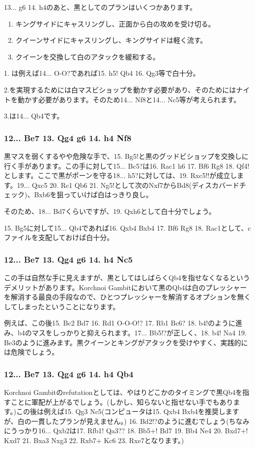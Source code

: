 13... g6 14. h4のあと、黒としてのプランはいくつかあります。
\begin{enumerate}
\item キングサイドにキャスリングし、正面から白の攻めを受け切る。
\item クイーンサイドにキャスリングし、キングサイドは軽く流す。
\item クイーンを交換して白のアタックを緩和する。
\end{enumerate}
1. は例えば14... O-O?であれば15. h5! Qb4 16. Qg3等で白十分。

2.を実現するためには白マスビショップを動かす必要があり、そのためにはナイトを動かす必要があります。そのため14... Nf8と14... Nc5等が考えられます。

3.は14... Qb4です。

\subsubsection{12... Be7 13. Qg4 g6 14. h4 Nf8}
黒マスを弱くするやや危険な手で、15. Bg5!と黒のグッドビショップを交換しに行く手があります。この手に対して15... Bc5?は16. Rac1 h6 17. Bf6 Rg8 18. Qf4!とします。ここで黒がポーンを守る18... h5?に対しては、19. Rxc5!!が成立します。19... Qxc5 20. Rc1 Qb6 21. Ng5!として次のNxf7からBd8(ディスカバードチェック)、Bxb6を狙っていけば白はっきり良し。

そのため、18... Bd7くらいですが、19. Qxh6として白十分でしょう。

15. Bg5に対して15... Qb4であれば16. Qxb4 Bxb4 17. Bf6 Rg8 18. Rac1として、cファイルを支配しておけば白十分。

\subsubsection{12... Be7 13. Qg4 g6 14. h4 Nc5}
この手は自然な手に見えますが、黒としてはしばらくQb4を指せなくなるというデメリットがあります。Korchnoi Gambitにおいて黒のQb4は白のプレッシャーを解消する最良の手段なので、ひとつプレッシャーを解消するオプションを無くしてしまったということになります。

例えば、この後15. Bc2 Bd7 16. Rd1 O-O-O!? 17. Rb1 Bc6? 18. b4!のように進み、b4のマスをしっかりと抑えられます。17... Bb5!?が正しく、18. b4! Na4 19. Be3のように進みます。黒クイーンとキングがアタックを受けやすく、実践的には危険でしょう。

\subsubsection{12... Be7 13. Qg4 g6 14. h4 Qb4}
Korchnoi Gambitのrefutationとしては、やはりどこかのタイミングで黒Qb4を指すことに軍配が上がるでしょう。(しかし、知らないと指せない手でもあります。)この後は例えば15. Qg3 Nc5(コンピュータは15. Qxb4 Bxb4を推奨しますが、白の一貫したプランが見えません。) 16. Bd2!?のように進むでしょう(ちなみにうっかり16... Qxb2は17. Rfb1! Qa3?? 18. Bb5+! Bd7 19. Bb4 Ne4 20. Bxd7+! Kxd7 21. Bxa3 Nxg3 22. Rxb7+ Kc6 23. Rxe7となります。)


